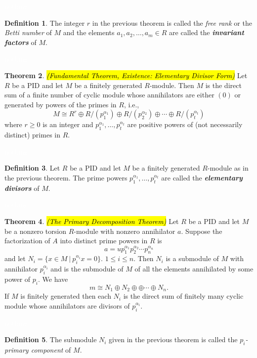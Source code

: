 \documentclass{article}
\theoremstyle{definition}
\newtheorem{thm}{Theorem}[section]
\newtheorem{defn}[thm]{Definition}
\newcommand{\nl}{\textcolor{white}{nothing}}
\newcommand{\al}{\alpha}
\begin{document}
\nl

\begin{defn}
The integer $r$ in the previous theorem is called the \textit{free rank} or the \textit{Betti number} of $M$ and the elements $a_1, a_2, \ldots, a_m\in R$ are called the \textit{\textbf{invariant factors}} of $M$.
\end{defn}

\nl

\begin{thm}\textit{\hl{(Fundamental Theorem, Existence: Elementary Divisor Form)}} 
Let $R$ be a PID and let $M$ be a finitely generated $R$-module. Then $M$ is the direct sum of a finite number of cyclic module whose annihilators are either $(0)$ or generated by powers of the primes in $R$, i.e.,
\[M\cong R^r \oplus R/(p_1^{\al_1})\oplus R/(p_2^{\al_2}) \oplus \cdots \oplus R/(p_t^{\al_t})\]
where $r\geq 0$ is an integer and $p_1^{\al_1},\ldots, p_t^{\al_t}$ are positive powers of (not necessarily distinct) primes in $R$.
\end{thm}

\nl

\begin{defn}
Let $R$ be a PID and let $M$ be a finitely generated $R$-module as in the previous theorem. The prime powers $p_1^{\al_1},\ldots, p_t^{\al_t}$ are called the \textit{\textbf{elementary divisors}} of $M$.
\end{defn}

\nl

\begin{thm}\hl{\textit{(The Primary Decomposition Theorem)}} Let $R$ be a PID and let $M$ be a nonzero torsion $R$-module with nonzero annihilator $a$. Suppose the factorization of $A$ into distinct prime powers in $R$ is 
\[a = up_1^{\al_1}p_2^{\al_2}\cdots p_n^{\al_n}\]
and let $N_i = \{x\in M\ |\ p_i^{\al_i}x = 0\}$. $1 \leq i\leq n$. Then $N_i$ is a submodule of $M$ with annihilator $p_i^{\al_i}$ and is the submodule of $M$ of all the elements annihilated by some power of $p_i$. We have
\[m\cong N_1\oplus N_2\oplus \oplus \cdots \oplus N_n.\]
If $M$ is finitely generated then each $N_i$ is the direct sum of finitely many cyclic module whose annihilators are divisors of $p_i^{\al_i}$.
\end{thm}

\nl

\begin{defn}
The submodule $N_i$ given in the previous theorem is called the $p_i$\textit{-primary component} of $M$.
\end{defn}
\end{document}
